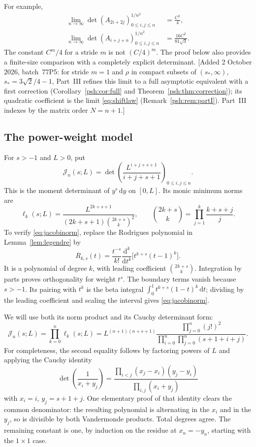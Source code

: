 \documentclass[11pt,a4paper]{article}
\numberwithin{equation}{section}
\theoremstyle{remark}\newtheorem{remark}[theorem]{Remark}
\newcommand{\J}{\mathcal J}
\newcommand{\dd}{\,\mathrm d}
\begin{document}
For example,
\begin{align}
 \lim_{n\to\infty}\det(A_{2i+2j})_{0\leq i,j\leq n}^{1/n^2}
   &=\frac{C^2}{4},\label{eq:stride2}\\
 \lim_{n\to\infty}\det(A_{i+j+n})_{0\leq i,j\leq n}^{1/n^2}
   &=\frac{16C^2}{81\sqrt3}.\label{eq:linear1}
\end{align}
The constant $C^m/4$ for a stride $m$ is not $(C/4)^m$. The proof below also
provides a finite-size comparison with a completely explicit determinant.
[Added 2 October 2026, batch~77P5: for stride $m=1$ and $\rho$ in compact
subsets of $(s_*,\infty)$, $s_*=3\sqrt2/4-1$, Part~III refines this limit to a
full asymptotic equivalent with a first correction
(Corollary~\ref{psh:cor:full} and Theorem~\ref{psh:thm:correction}); its
quadratic coefficient is the limit \eqref{eq:shiftlaw}
(Remark~\ref{psh:rem:partI}). Part~III indexes by the matrix order $N=n+1$.]

\subsection{The power-weight model}
For $s>-1$ and $L>0$, put
\begin{equation}\label{eq:Jdef}
 \J_n(s;L)=\det\left(\frac{L^{i+j+s+1}}{i+j+s+1}\right)_{0\leq i,j\leq n}.
\end{equation}
This is the moment determinant of $y^s\dd y$ on $[0,L]$.
Its monic minimum norms are
\begin{equation}\label{eq:jacobinorm}
 \ell_k(s;L)=\frac{L^{2k+s+1}}
 {(2k+s+1)\binom{2k+s}{k}^2},\qquad
 \binom{2k+s}{k}=\prod_{j=1}^k\frac{k+s+j}{j}.
\end{equation}
To verify \eqref{eq:jacobinorm}, replace the Rodrigues polynomial in
Lemma~\ref{lem:legendre} by
\[
 R_{k,s}(t)=\frac{t^{-s}}{k!}\frac{\mathrm d^k}{\mathrm dt^k}
        \bigl[t^{k+s}(t-1)^k\bigr].
\]
It is a polynomial of degree $k$, with leading coefficient
$\binom{2k+s}{k}$. Integration by parts proves orthogonality for weight $t^s$.
The boundary terms vanish because $s>-1$. Its pairing with $t^k$ is the beta
integral $\int_0^1t^{k+s}(1-t)^k\dd t$; dividing by the leading coefficient
and scaling the interval gives \eqref{eq:jacobinorm}.

We will use both its norm product and its Cauchy determinant form:
\begin{equation}\label{eq:Jexact}
 \J_n(s;L)=\prod_{k=0}^n\ell_k(s;L)
 =L^{(n+1)(n+s+1)}
   \frac{\prod_{j=0}^n(j!)^2}
        {\prod_{i=0}^n\prod_{j=0}^n(s+1+i+j)}.
\end{equation}
For completeness, the second equality follows by factoring powers of $L$
and applying the Cauchy identity
\[
 \det\left(\frac1{x_i+y_j}\right)
 =\frac{\prod_{i<j}(x_j-x_i)(y_j-y_i)}{\prod_{i,j}(x_i+y_j)}
\]
with $x_i=i$, $y_j=s+1+j$. One elementary proof of that identity clears the
common denominator: the resulting polynomial is alternating in the $x_i$
and in the $y_j$, so is divisible by both Vandermonde products. Total degrees
agree. The remaining constant is one, by induction on the residue at
$x_n=-y_n$, starting with the $1\times1$ case.
\end{document}
